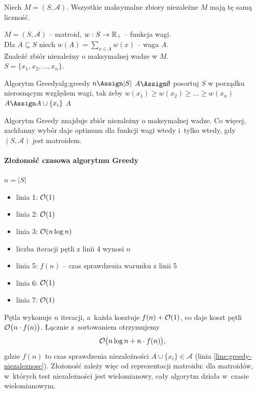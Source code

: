 \begin{lemma} \label{lemma:matroid:liczność}
	Niech $M = (S, \mathcal{A})$. Wszystkie maksymalne zbiory niezależne $M$ mają tę samą liczność.
\end{lemma}
\begin{problem}
	$M = (S, \mathcal{A})$ -- matroid, $w: S \to \mathbb{R_+}$ -- funkcja wagi.\\
	Dla $A \subseteq S$ niech $w(A) = \sum_{x \in A} w(x)$ -- waga $A$.\\
	Znaleźć zbiór niezależny o maksymalnej wadze w $M$.\\
	$S = \{x_1, x_2, \ldots, x_n\}$.
\end{problem}

\begin{alg}{Algorytm Greedy}{alg:greedy}
	\State $n \Assign |S|$
	\State $A \Assign \emptyset$ 
	\State posortuj $S$ w porządku nierosnącym względem wagi, tak żeby $w(x_1) \geq w(x_2) \geq \ldots \geq w(x_n)$
	 \label{line:greedy-niezaleznosc}
	\State $A \Assign A \cup \{x_i\}$
	\EndIf
	\EndFor
	\State \Return $A$
	\EndFunction
\end{alg}

\begin{theorem} \label{thm:rado-edmonds}
	Algorytm Greedy znajduje zbiór niezależny o maksymalnej wadze. Co więcej, zachłanny wybór daje
	optimum dla  funkcji wagi wtedy i~tylko wtedy, gdy $(S, \mathcal{A})$ jest matroidem.
\end{theorem}

\paragraph{Złożoność czasowa algorytmu Greedy}
$n = |S|$
\begin{itemize}[nosep]
	\item linia 1: $\mathcal{O}(1)$
	\item linia 2: $\mathcal{O}(1)$
	\item linia 3: $\mathcal{O}(n \log n)$
	\item liczba iteracji pętli z linii 4 wynosi $n$
	\item linia 5: $f(n)$ -- czas sprawdzenia warunku z linii 5
	\item linia 6: $\mathcal{O}(1)$
	\item linia 7: $\mathcal{O}(1)$
\end{itemize}
Pętla wykonuje $n$ iteracji, a~każda kosztuje $f(n) + \mathcal{O}(1)$, co daje koszt pętli $\mathcal{O}\bigl(n \cdot f(n)\bigr)$. Łącznie z~sortowaniem otrzymujemy
\[
	\mathcal{O}\bigl(n \log n + n \cdot f(n)\bigr),
\]
gdzie $f(n)$ to czas sprawdzenia niezależności $A \cup \{x_i\} \in \mathcal{A}$ (linia \ref{line:greedy-niezaleznosc}). Złożoność zależy więc od reprezentacji matroidu: dla matroidów, w~których test niezależności jest wielomianowy, cały algorytm działa w~czasie wielomianowym.

